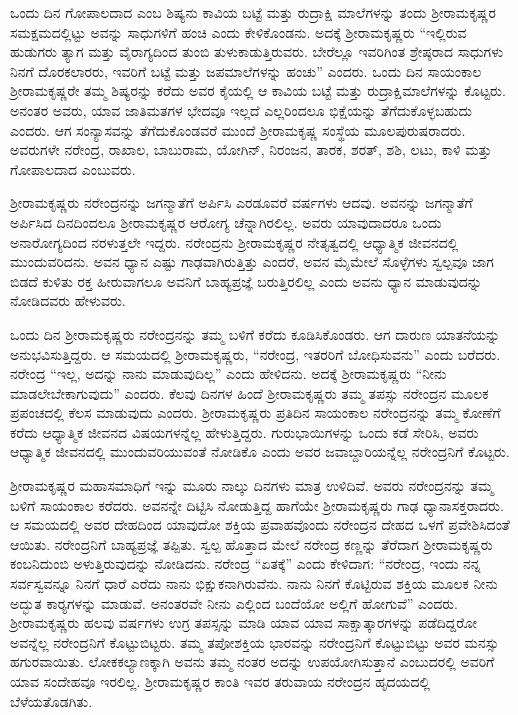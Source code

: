 ಒಂದು ದಿನ ಗೋಪಾಲದಾದ ಎಂಬ ಶಿಷ್ಯನು ಕಾವಿಯ ಬಟ್ಟೆ ಮತ್ತು ರುದ್ರಾಕ್ಷಿ ಮಾಲೆಗಳನ್ನು ತಂದು ಶ‍್ರೀರಾಮಕೃಷ್ಣರ ಸಮಕ್ಷಮದಲ್ಲಿಟ್ಟು ಅವನ್ನು ಸಾಧುಗಳಿಗೆ ಹಂಚಿ ಎಂದು ಕೇಳಿಕೊಂಡನು. ಅದಕ್ಕೆ ಶ‍್ರೀರಾಮಕೃಷ್ಣರು “ಇಲ್ಲಿರುವ ಹುಡುಗರು ತ್ಯಾಗ ಮತ್ತು ವೈರಾಗ್ಯದಿಂದ ತುಂಬಿ ತುಳುಕಾಡುತ್ತಿರುವರು. ಬೇರೆಲ್ಲೂ ಇವರಿಗಿಂತ ಶ್ರೇಷ್ಠರಾದ ಸಾಧುಗಳು ನಿನಗೆ ದೊರಕಲಾರರು, ಇವರಿಗೆ ಬಟ್ಟೆ ಮತ್ತು ಜಪಮಾಲೆಗಳನ್ನು ಹಂಚು” ಎಂದರು. ಒಂದು ದಿನ ಸಾಯಂಕಾಲ ಶ‍್ರೀರಾಮಕೃಷ್ಣರೇ ತಮ್ಮ ಶಿಷ್ಯರನ್ನು ಕರೆದು ಅವರ ಕೈಯಲ್ಲಿ ಆ ಕಾವಿಯ ಬಟ್ಟೆ ಮತ್ತು ರುದ್ರಾಕ್ಷಿಮಾಲೆಗಳನ್ನು ಕೊಟ್ಟರು. ಅನಂತರ ಅವರು, ಯಾವ ಜಾತಿಮತಗಳ ಭೇದವೂ ಇಲ್ಲದೆ ಎಲ್ಲರಿಂದಲೂ ಭಿಕ್ಷೆಯನ್ನು ತೆಗೆದುಕೊಳ್ಳಬಹುದು ಎಂದರು. ಆಗ ಸಂನ್ಯಾಸವನ್ನು ತೆಗೆದುಕೊಂಡವರೆ ಮುಂದೆ ಶ‍್ರೀರಾಮಕೃಷ್ಣ ಸಂಸ್ಥೆಯ ಮೂಲಪುರುಷರಾದರು. ಅವರುಗಳೇ ನರೇಂದ್ರ, ರಾಖಾಲ, ಬಾಬುರಾಮ, ಯೋಗಿನ್, ನಿರಂಜನ, ತಾರಕ, ಶರತ್, ಶಶಿ, ಲಟು, ಕಾಳಿ ಮತ್ತು ಗೋಪಾಲದಾದ ಎಂಬುವರು.

ಶ‍್ರೀರಾಮಕೃಷ್ಣರು ನರೇಂದ್ರನನ್ನು ಜಗನ್ಮಾತೆಗೆ ಅರ್ಪಿಸಿ ಎರಡೂವರೆ ವರ್ಷಗಳು ಆದವು. ಅವನನ್ನು ಜಗನ್ಮಾತೆಗೆ ಅರ್ಪಿಸಿದ ದಿನದಿಂದಲೂ ಶ‍್ರೀರಾಮಕೃಷ್ಣರ ಆರೋಗ್ಯ ಚೆನ್ನಾಗಿರಲಿಲ್ಲ. ಅವರು ಯಾವುದಾದರೂ ಒಂದು ಅನಾರೋಗ್ಯದಿಂದ ನರಳುತ್ತಲೇ ಇದ್ದರು. ನರೇಂದ್ರನು ಶ‍್ರೀರಾಮಕೃಷ್ಣರ ನೇತೃತ್ವದಲ್ಲಿ ಆಧ್ಯಾತ್ಮಿಕ ಜೀವನದಲ್ಲಿ ಮುಂದುವರಿದನು. ಅವನ ಧ್ಯಾನ ಎಷ್ಟು ಗಾಢವಾಗಿರುತ್ತಿತ್ತು ಎಂದರೆ, ಅವನ ಮೈಮೇಲೆ ಸೊಳ್ಳೆಗಳು ಸ್ವಲ್ಪವೂ ಜಾಗ ಬಿಡದೆ ಕುಳಿತು ರಕ್ತ ಹೀರುವಾಗಲೂ ಅವನಿಗೆ ಬಾಹ್ಯಪ್ರಜ್ಞೆ ಬರುತ್ತಿರಲಿಲ್ಲ ಎಂದು ಅವನು ಧ್ಯಾನ ಮಾಡುವುದನ್ನು ನೋಡಿದವರು ಹೇಳುವರು.

ಒಂದು ದಿನ ಶ‍್ರೀರಾಮಕೃಷ್ಣರು ನರೇಂದ್ರನನ್ನು ತಮ್ಮ ಬಳಿಗೆ ಕರೆದು ಕೂಡಿಸಿಕೊಂಡರು. ಆಗ ದಾರುಣ ಯಾತನೆಯನ್ನು ಅನುಭವಿಸುತ್ತಿದ್ದರು. ಆ ಸಮಯದಲ್ಲಿ ಶ‍್ರೀರಾಮಕೃಷ್ಣರು, “ನರೇಂದ್ರ, ಇತರರಿಗೆ ಬೋಧಿಸುವನು” ಎಂದು ಬರೆದರು. ನರೇಂದ್ರ “ಇಲ್ಲ, ಅದನ್ನು ನಾನು ಮಾಡುವುದಿಲ್ಲ” ಎಂದು ಹೇಳಿದನು. ಅದಕ್ಕೆ ಶ‍್ರೀರಾಮಕೃಷ್ಣರು “ನೀನು ಮಾಡಲೇಬೇಕಾಗುವುದು” ಎಂದರು. ಕೆಲವು ದಿನಗಳ ಹಿಂದೆ ಶ‍್ರೀರಾಮಕೃಷ್ಣರು ತಮ್ಮ ತಪಸ್ಸು ನರೇಂದ್ರನ ಮೂಲಕ ಪ್ರಪಂಚದಲ್ಲಿ ಕೆಲಸ ಮಾಡುವುದು ಎಂದರು. ಶ‍್ರೀರಾಮಕೃಷ್ಣರು ಪ್ರತಿದಿನ ಸಾಯಂಕಾಲ ನರೇಂದ್ರನನ್ನು ತಮ್ಮ ಕೋಣೆಗೆ ಕರೆದು ಆಧ್ಯಾತ್ಮಿಕ ಜೀವನದ ವಿಷಯಗಳನ್ನೆಲ್ಲ ಹೇಳುತ್ತಿದ್ದರು. ಗುರುಭಾಯಿಗಳನ್ನು ಒಂದು ಕಡೆ ಸೇರಿಸಿ, ಅವರು ಆಧ್ಯಾತ್ಮಿಕ ಜೀವನದಲ್ಲಿ ಮುಂದುವರಿಯುವಂತೆ ನೋಡಿಕೊ ಎಂದು ಅವರ ಜವಾಬ್ದಾರಿಯನ್ನೆಲ್ಲ ನರೇಂದ್ರನಿಗೆ ಕೊಟ್ಟರು.

ಶ‍್ರೀರಾಮಕೃಷ್ಣರ ಮಹಾಸಮಾಧಿಗೆ ಇನ್ನು ಮೂರು ನಾಲ್ಕು ದಿನಗಳು ಮಾತ್ರ ಉಳಿದಿವೆ. ಅವರು ನರೇಂದ್ರನನ್ನು ತಮ್ಮ ಬಳಿಗೆ ಸಾಯಂಕಾಲ ಕರೆದರು. ಅವನನ್ನೇ ದಿಟ್ಟಿಸಿ ನೋಡುತ್ತಿದ್ದ ಹಾಗೆಯೇ ಶ‍್ರೀರಾಮಕೃಷ್ಣರು ಗಾಢ ಧ್ಯಾನಾಸಕ್ತರಾದರು. ಆ ಸಮಯದಲ್ಲಿ ಅವರ ದೇಹದಿಂದ ಯಾವುದೋ ಶಕ್ತಿಯ ಪ್ರವಾಹವೊಂದು ನರೇಂದ್ರನ ದೇಹದ ಒಳಗೆ ಪ್ರವೇಶಿಸಿದಂತೆ ಆಯಿತು. ನರೇಂದ್ರನಿಗೆ ಬಾಹ್ಯಪ್ರಜ್ಞೆ ತಪ್ಪಿತು. ಸ್ವಲ್ಪ ಹೊತ್ತಾದ ಮೇಲೆ ನರೇಂದ್ರ ಕಣ್ಣನ್ನು ತೆರೆದಾಗ ಶ‍್ರೀರಾಮಕೃಷ್ಣರು ಕಂಬನಿದುಂಬಿ ಅಳುತ್ತಿರುವುದನ್ನು ನೋಡಿದನು. ನರೇಂದ್ರ “ಏತಕ್ಕೆ” ಎಂದು ಕೇಳಿದಾಗ: “ನರೇಂದ್ರ, ಇಂದು ನನ್ನ ಸರ್ವಸ್ವವನ್ನೂ ನಿನಗೆ ಧಾರೆ ಎರೆದು ನಾನು ಭಿಕ್ಷುಕನಾಗಿರುವೆನು. ನಾನು ನಿನಗೆ ಕೊಟ್ಟಿರುವ ಶಕ್ತಿಯ ಮೂಲಕ ನೀನು ಅದ್ಭುತ ಕಾರ‍್ಯಗಳನ್ನು ಮಾಡುವೆ. ಅನಂತರವೇ ನೀನು ಎಲ್ಲಿಂದ ಬಂದೆಯೋ ಅಲ್ಲಿಗೆ ಹೋಗುವೆ” ಎಂದರು. ಶ‍್ರೀರಾಮಕೃಷ್ಣರು ಹಲವು ವರ್ಷಗಳು ಉಗ್ರ ತಪಸ್ಸನ್ನು ಮಾಡಿ ಯಾವ ಯಾವ ಸಾಕ್ಷಾತ್ಕಾರಗಳನ್ನು ಪಡೆದಿದ್ದರೋ ಅವನ್ನೆಲ್ಲ ನರೇಂದ್ರನಿಗೆ ಕೊಟ್ಟುಬಿಟ್ಟರು. ತಮ್ಮ ತಪೋಶಕ್ತಿಯ ಭಾರವನ್ನು ನರೇಂದ್ರನಿಗೆ ಕೊಟ್ಟುಬಿಟ್ಟು ಅವರ ಮನಸ್ಸು ಹಗುರವಾಯಿತು. ಲೋಕಕಲ್ಯಾಣಕ್ಕಾಗಿ ಅವನು ತಮ್ಮ ನಂತರ ಅದನ್ನು ಉಪಯೋಗಿಸುತ್ತಾನೆ ಎಂಬುದರಲ್ಲಿ ಅವರಿಗೆ ಯಾವ ಸಂದೇಹವೂ ಇರಲಿಲ್ಲ. ಶ‍್ರೀರಾಮಕೃಷ್ಣರ ಕಾಂತಿ ಇವರ ತರುವಾಯ ನರೇಂದ್ರನ ಹೃದಯದಲ್ಲಿ ಬೆಳೆಯತೊಡಗಿತು.

